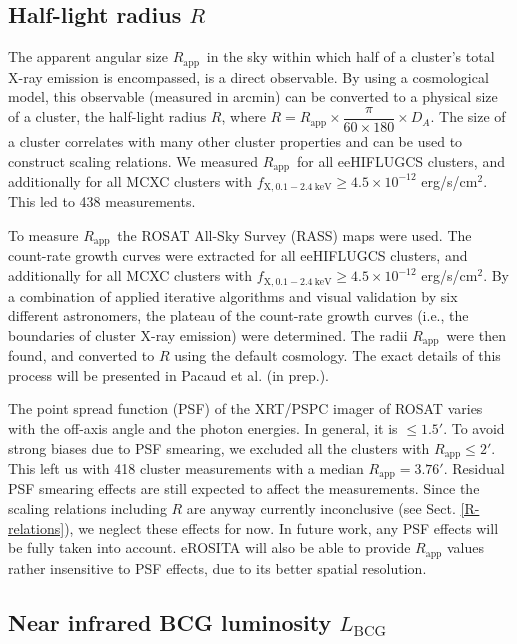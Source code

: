 \documentclass{aa}   %
\newcommand{\Rapp}{$R_{\text{app}}$}
\begin{document}
\subsection{Half-light radius $R$}

The apparent angular size  \Rapp\ in the sky within which half of a cluster's total X-ray emission is encompassed, is a direct observable. By using a cosmological model, this observable (measured in arcmin) can be converted to a physical size of a cluster, the half-light radius $R$, where $R=R_{\text{app}}\times \dfrac{\pi }{60\times 180}\times D_A$. The size of a cluster correlates with many other cluster properties and can be used to construct scaling relations. We measured \Rapp\ for all eeHIFLUGCS clusters, and additionally for all MCXC clusters with $f_{\text{X}, 0.1-2.4\ \text{keV}}\geq 4.5\times 10^{-12}$ erg/s/cm$^2$. This led to 438 measurements. 

To measure \Rapp\ the ROSAT All-Sky Survey (RASS) maps were used. The count-rate growth curves were extracted for all eeHIFLUGCS clusters, and additionally for all MCXC clusters with $f_{\text{X}, 0.1-2.4\ \text{keV}}\geq 4.5\times 10^{-12}$ erg/s/cm$^2$. By a combination of applied iterative algorithms and visual validation by six different astronomers, the plateau of the count-rate growth curves (i.e., the boundaries of cluster X-ray emission) were determined. The radii \Rapp\ were then found, and converted to $R$ using the default cosmology. The exact details of this process will be presented in Pacaud et al. (in prep.). 

The point spread function (PSF) of the XRT/PSPC imager of ROSAT varies with the off-axis angle and the photon energies. In general, it is $\leq 1.5'$. To avoid strong biases due to PSF smearing, we excluded all the clusters with $R_{\text{app}}\leq 2'$. This left us with 418 cluster measurements with a median $R_{\text{app}}=3.76'$. Residual PSF smearing effects are still expected to affect the measurements. Since the scaling relations including $R$ are anyway currently inconclusive (see Sect. \ref{R-relations}), we neglect these effects for now. In future work, any PSF effects will be fully taken into account. eROSITA will also be able to provide $R_{\text{app}}$ values rather insensitive to PSF effects, due to its better spatial resolution.

\subsection{Near infrared BCG luminosity $L_{\text{BCG}}$}
\end{document}
